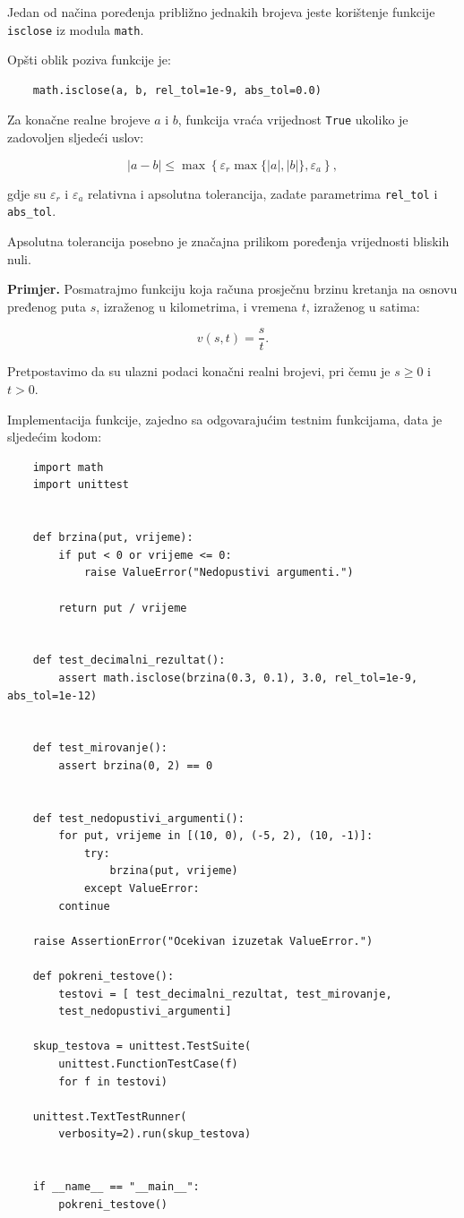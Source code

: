 Jedan od načina poređenja približno jednakih brojeva 
jeste korištenje funkcije \texttt{isclose} iz modula 
\texttt{math}.

Opšti oblik poziva funkcije je:

\begin{verbatim}
	math.isclose(a, b, rel_tol=1e-9, abs_tol=0.0)
\end{verbatim}

Za konačne realne brojeve $a$ i $b$, funkcija vraća 
vrijednost \texttt{True} ukoliko je zadovoljen 
sljedeći uslov:

\[
|a-b|
\leq
\max\left\{
\varepsilon_r\max\{|a|,|b|\},
\varepsilon_a
\right\},
\]

gdje su $\varepsilon_r$ i $\varepsilon_a$ relativna 
i apsolutna tolerancija, zadate parametrima 
\texttt{rel\_tol} i \texttt{abs\_tol}.

Apsolutna tolerancija posebno je značajna prilikom 
poređenja vrijednosti bliskih nuli.

\textbf{Primjer.} Posmatrajmo funkciju koja računa 
prosječnu brzinu kretanja na osnovu pređenog puta 
$s$, izraženog u kilometrima, i vremena $t$, 
izraženog u satima:

\[
v(s,t)=\frac{s}{t}.
\]

Pretpostavimo da su ulazni podaci konačni realni 
brojevi, pri čemu je $s\geq 0$ i $t>0$.

Implementacija funkcije, zajedno sa odgovarajućim 
testnim funkcijama, data je sljedećim kodom:

\begin{verbatim}
	import math
	import unittest
	
	
	def brzina(put, vrijeme):
	    if put < 0 or vrijeme <= 0:
	        raise ValueError("Nedopustivi argumenti.")
	
	    return put / vrijeme
	
	
	def test_decimalni_rezultat():
	    assert math.isclose(brzina(0.3, 0.1), 3.0, rel_tol=1e-9, abs_tol=1e-12)
	
	
	def test_mirovanje():
   	    assert brzina(0, 2) == 0
	
	
	def test_nedopustivi_argumenti():
	    for put, vrijeme in [(10, 0), (-5, 2), (10, -1)]:
	        try:
	            brzina(put, vrijeme)
	        except ValueError:
	    continue
	
	raise AssertionError("Ocekivan izuzetak ValueError.")
	
	def pokreni_testove():
	    testovi = [ test_decimalni_rezultat, test_mirovanje,
	    test_nedopustivi_argumenti]
	
	skup_testova = unittest.TestSuite(
	    unittest.FunctionTestCase(f)
	    for f in testovi)
	
	unittest.TextTestRunner(
	    verbosity=2).run(skup_testova)
	
	
	if __name__ == "__main__":
	    pokreni_testove()
\end{verbatim}

